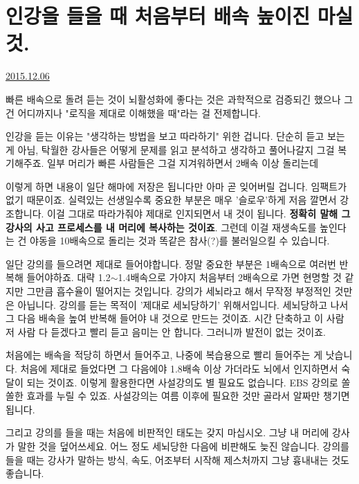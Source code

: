 \section{인강을 들을 때 처음부터 배속 높이진 마실 것.}
\href{https://www.kockoc.com/Apoc/530936}{2015.12.06}

\vspace{5mm}

빠른 배속으로 돌려 듣는 것이 뇌활성화에 좋다는 것은 과학적으로 검증되긴 했으나
그건 어디까지나 "로직을 제대로 이해했을 때"라는 걸 전제합니다.
\vspace{5mm}

인강을 듣는 이유는 "생각하는 방법을 보고 따라하기" 위한 겁니다.
단순히 듣고 보는 게 아님, 탁월한 강사들은 어떻게 문제를 읽고 분석하고 생각하고 풀어나갈지 그걸 복기해주죠.
일부 머리가 빠른 사람들은 그걸 지겨워하면서 2배속 이상 돌리는데
\vspace{5mm}

이렇게 하면 내용이 일단 해마에 저장은 됩니다만 아마 곧 잊어버릴 겁니다. 임팩트가 없기 때문이죠.
실력있는 선생일수록 중요한 부분은 매우 '슬로우'하게 저음 깔면서 강조합니다.
이걸 그대로 따라가줘야 제대로 인지되면서 내 것이 됩니다. \textbf{정확히 말해 그 강사의 사고 프로세스를 내 머리에 복사하는 것이죠}.
그런데 이걸 재생속도를 높인다는 건 야동을 10배속으로 돌리는 것과 똑같은 참사(?)를 불러일으킬 수 있습니다.
\vspace{5mm}

일단 강의를 들으려면 제대로 들어야합니다. 정말 중요한 부분은 1배속으로 여러번 반복해 들어야하죠.
대략 1.2$\sim$1.4배속으로 가야지 처음부터 2배속으로 가면 현명할 것 같지만 그만큼 흡수율이 떨어지는 것입니다.
강의가 세뇌라고 해서 무작정 부정적인 것만은 아닙니다. 강의를 듣는 목적이 '제대로 세뇌당하기' 위해서입니다.
세뇌당하고 나서 그 다음 배속을 높여 반복해 들어야 내 것으로 만드는 것이죠.
시간 단축하고 이 사람 저 사람 다 듣겠다고 빨리 듣고 음미는 안 합니다. 그러니까 발전이 없는 것이죠.
\vspace{5mm}

처음에는 배속을 적당히 하면서 들어주고, 나중에 복습용으로 빨리 들어주는 게 낫습니다.
처음에 제대로 들었다면 그 다음에야 1.8배속 이상 가더라도 뇌에서 인지하면서 숙달이 되는 것이죠.
이렇게 활용한다면 사설강의도 별 필요도 없습니다. EBS 강의로 쏠쏠한 효과를 누릴 수 있죠.
사설강의는 여름 이후에 필요한 것만 골라서 알짜만 챙기면 됩니다.
\vspace{5mm}

그리고 강의를 들을 때는 처음에 비판적인 태도는 갖지 마십시오. 그냥 내 머리에 강사가 말한 것을 덮어쓰세요.
어느 정도 세뇌당한 다음에 비판해도 늦진 않습니다.
강의를 들을 때는 강사가 말하는 방식, 속도, 어조부터 시작해 제스처까지 그냥 흉내내는 것도 좋습니다.
\vspace{5mm}






